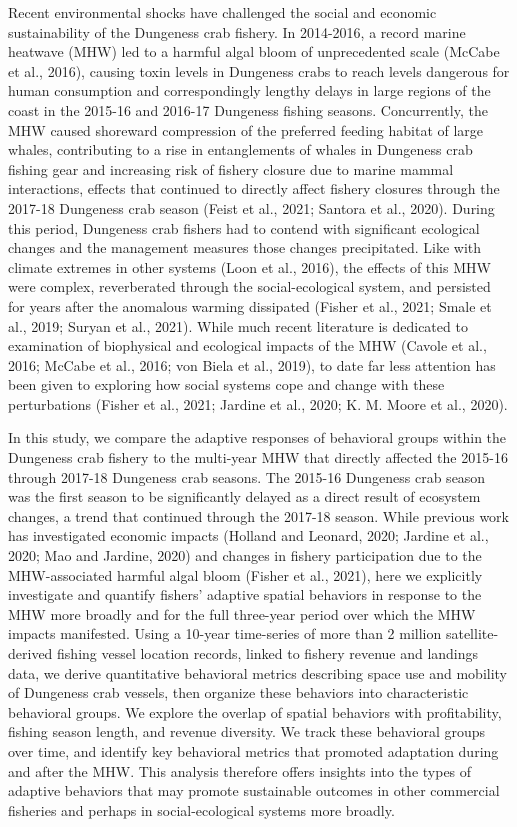 \documentclass[]{elsarticle} %
\begin{document}
Recent environmental shocks have challenged the social and economic
sustainability of the Dungeness crab fishery. In 2014-2016, a record
marine heatwave (MHW) led to a harmful algal bloom of unprecedented
scale (McCabe et al., 2016), causing toxin levels in Dungeness crabs to
reach levels dangerous for human consumption and correspondingly lengthy
delays in large regions of the coast in the 2015-16 and 2016-17
Dungeness fishing seasons. Concurrently, the MHW caused shoreward
compression of the preferred feeding habitat of large whales,
contributing to a rise in entanglements of whales in Dungeness crab
fishing gear and increasing risk of fishery closure due to marine mammal
interactions, effects that continued to directly affect fishery closures
through the 2017-18 Dungeness crab season (Feist et al., 2021; Santora
et al., 2020). During this period, Dungeness crab fishers had to contend
with significant ecological changes and the management measures those
changes precipitated. Like with climate extremes in other systems (Loon
et al., 2016), the effects of this MHW were complex, reverberated
through the social-ecological system, and persisted for years after the
anomalous warming dissipated (Fisher et al., 2021; Smale et al., 2019;
Suryan et al., 2021). While much recent literature is dedicated to
examination of biophysical and ecological impacts of the MHW (Cavole et
al., 2016; McCabe et al., 2016; von Biela et al., 2019), to date far
less attention has been given to exploring how social systems cope and
change with these perturbations (Fisher et al., 2021; Jardine et al.,
2020; K. M. Moore et al., 2020).

In this study, we compare the adaptive responses of behavioral groups
within the Dungeness crab fishery to the multi-year MHW that directly
affected the 2015-16 through 2017-18 Dungeness crab seasons. The 2015-16
Dungeness crab season was the first season to be significantly delayed
as a direct result of ecosystem changes, a trend that continued through
the 2017-18 season. While previous work has investigated economic
impacts (Holland and Leonard, 2020; Jardine et al., 2020; Mao and
Jardine, 2020) and changes in fishery participation due to the
MHW-associated harmful algal bloom (Fisher et al., 2021), here we
explicitly investigate and quantify fishers' adaptive spatial behaviors
in response to the MHW more broadly and for the full three-year period
over which the MHW impacts manifested. Using a 10-year time-series of
more than 2 million satellite-derived fishing vessel location records,
linked to fishery revenue and landings data, we derive quantitative
behavioral metrics describing space use and mobility of Dungeness crab
vessels, then organize these behaviors into characteristic behavioral
groups. We explore the overlap of spatial behaviors with profitability,
fishing season length, and revenue diversity. We track these behavioral
groups over time, and identify key behavioral metrics that promoted
adaptation during and after the MHW. This analysis therefore offers
insights into the types of adaptive behaviors that may promote
sustainable outcomes in other commercial fisheries and perhaps in
social-ecological systems more broadly.
\end{document}
